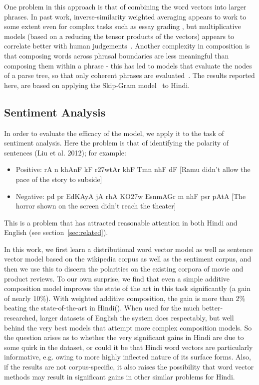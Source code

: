 \cite{Chirawichitchai:14}
\cite{Sharma:14}
One problem in this approach is that of  combining the word vectors into larger phrases. In past work, inverse-similarity weighted averaging appears to work to some extent even for complex tasks such as essay grading \cite{Landauer:03}, but multiplicative models (based on a reducing the tensor products of the vectors) appears to correlate better with human judgements~\cite{Mitchell:08,Socher:13}.
Another complexity in composition is that composing words across phrasal boundaries are less meaningful than composing them within a phrase - this has led to models that evaluate the nodes of a parse tree, so that only coherent phrases are evaluated~\cite{Socher:13}. The results reported here, are based on applying the Skip-Gram  model~\cite{Mikolov:13b} to Hindi. 

\subsection{Sentiment Analysis}
In order to evaluate the efficacy of the model, we apply it to the task of sentiment analysis. Here the problem is that of identifying the polarity of sentences (Liu et al. 2012); for example: 
\begin{itemize}
\item Positive: {\dn rA n\? khAnF kF r\327wtAr khF{\qva} Tmn\? nhF{\qva} dF} [Ramu didn't allow the pace of the story to subside]
\item Negative: {\dn pd\?{\qvb} pr EdKAyA jA rhA KO\327w Esn\?mAGr m\?
nhF{\qva} psr pAtA} [The horror shown on the screen didn't reach the theater]
\end{itemize}

This is a problem that has attracted reasonable attention in both Hindi and English (see section~\ref{sec:related}). 

In this work, we first learn a distributional word vector model as well as sentence vector model based on the wikipedia corpus as well as the sentiment corpus, and then we use this to discern the polarities on the existing corpora of movie and product reviews. To our own surprise, we find that even a simple additive composition model improves the state of the art in this task significantly (a gain of nearly 10\%). With weighted additive composition, the gain is more than 2\% beating the state-of-the-art in Hindi(\cite{Singh:15}). When used for the much better-researched, larger datasets of English the system does respectably, but well behind the very best models that attempt more complex composition models. So the question arises as to whether the very significant gains in Hindi are due to some quirk in the dataset, or could it be that Hindi word vectors are particularly informative,
e.g. owing to more highly inflected nature of its surface forms.  Also, if the results are not corpus-specific, it also raises the possibility that word vector methods may result in significant gains in
other similar problems for Hindi. 


